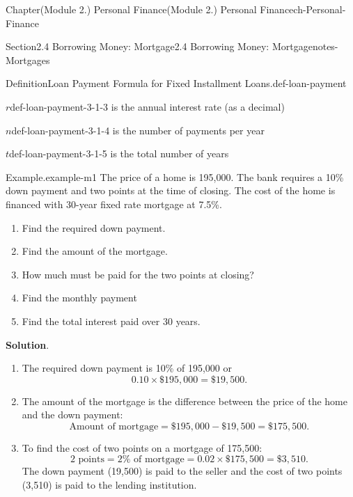 \documentclass[oneside,10pt,]{book}
\newcommand{\blocktitlefont}{\relax}
\begin{document}
\begin{chapterptx}{Chapter}{(Module 2.) Personal Finance}{}{(Module 2.) Personal Finance}{}{}{ch-Personal-Finance}
\begin{sectionptx}{Section}{2.4 Borrowing Money: Mortgage}{}{2.4 Borrowing Money: Mortgage}{}{}{notes-Mortgages}
\begin{definition}{Definition}{Loan Payment Formula for Fixed Installment Loans.}{def-loan-payment}
\begin{descriptionlist}
\begin{dlimedium}{\(r\)}{def-loan-payment-3-1-3}
is the annual interest rate (as a decimal)%
\end{dlimedium}%
\begin{dlimedium}{\(n\)}{def-loan-payment-3-1-4}%
is the number of payments per year%
\end{dlimedium}%
\begin{dlimedium}{\(t\)}{def-loan-payment-3-1-5}%
is the total number of years%
\end{dlimedium}%
\end{descriptionlist}
%
\end{definition}
\begin{example}{Example}{.}{example-m1}%
The price of a home is \textdollar{}195,000. The bank requires a 10\% down payment and two points at the time of closing. The cost of the home is financed with 30-year fixed rate mortgage at 7.5\%.%
%
\begin{enumerate}
\item{}Find the required down payment.%
\item{}Find the amount of the mortgage.%
\item{}How much must be paid for the two points at closing?%
\item{}Find the monthly payment%
\item{}Find the total interest paid over 30 years.%
\end{enumerate}
\par\smallskip%
\noindent\textbf{\blocktitlefont Solution}.\hypertarget{example-m1-3}{}\quad{}%
\begin{enumerate}
\item{}The required down payment is 10\% of \textdollar{}195,000 or%
\begin{equation*}
0.10 \times \$195,000 = \$19,500.
\end{equation*}
%
\item{}The amount of the mortgage is the difference between the price of the home and the down payment:%
\begin{equation*}
\text{Amount of mortgage} = \$195,000 - \$19,500 = \$175,500.
\end{equation*}
%
\item{}To find the cost of two points on a mortgage of \textdollar{}175,500:%
\begin{equation*}
\text{2 points} = 2\% \text{ of mortgage} = 0.02 \times \$175,500 = \$3,510.
\end{equation*}
The down payment (\textdollar{}19,500) is paid to the seller and the cost of two points (\textdollar{}3,510) is paid to the lending institution.%

\end{enumerate}
\end{example}
\end{sectionptx}
\end{chapterptx}
\end{document}
